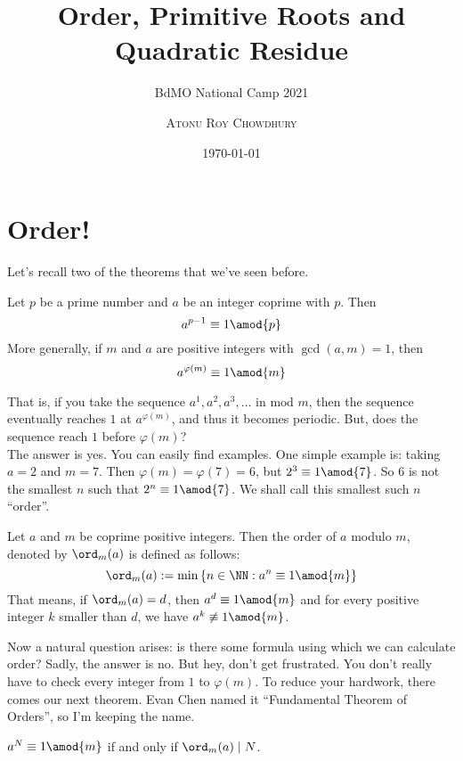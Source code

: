 \documentclass[11pt]{scrartcl}
\begin{document}
\title{Order, Primitive Roots and Quadratic Residue}
\subtitle{BdMO National Camp 2021}
\author{\scshape{Atonu Roy Chowdhury} \\
}
\date{\today}
\maketitle

\section{Order!}
Let's recall two of the theorems that we've seen before.
\begin{theorem}
Let \(p\) be a prime number and \(a\) be an integer coprime with \(p\). Then
\[a^{p-1}\equiv 1 \amod{p}\]
More generally, if \(m\) and \(a\) are positive integers with \(\gcd(a,m) =1\), then
\[a^{\varphi(m)} \equiv 1 \amod{m}\]
\end{theorem}
That is, if you take the sequence \(a^1, a^2, a^3, \ldots\) in \(\text{mod }m\), then the sequence eventually reaches \(1\) at \(a^{\varphi(m)}\), and thus it becomes periodic. But, does the sequence reach \(1\) before \(\varphi(m)\)?\\
The answer is yes. You can easily find examples. One simple example is: taking \(a=2\) and \(m=7\). Then \(\varphi(m)=\varphi(7)=6\), but \(2^3 \equiv 1 \amod{7}\). So \(6\) is not the smallest \(n\) such that \(2^n \equiv 1 \amod{7}\). We shall call this smallest such \(n\) ``order''. 
\begin{defn}
Let \(a\) and \(m\) be coprime positive integers. Then the order of \(a\) modulo \(m\), denoted by \(\ord_m(a)\) is defined as follows:
\[\ord_m(a) := \min \left\{n\in\NN : a^n \equiv 1 \amod{m}\right\}\]
That means, if \(\ord_m(a) = d\), then \(a^d \equiv 1 \amod{m}\) and for every positive integer \(k\) smaller than \(d\), we have \(a^k \not\equiv 1 \amod{m}\).
\end{defn}
Now a natural question arises: is there some formula using which we can calculate order? Sadly, the answer is no. But hey, don't get frustrated. You don't really have to check every integer from \(1\) to \(\varphi(m)\). To reduce your hardwork, there comes our next theorem. Evan Chen named it ``Fundamental Theorem of Orders'', so I'm keeping the name.
\begin{theorem}
\(a^N \equiv 1 \amod{m}\) if and only if \(\ord_m(a) \mid N\). 
\end{theorem}
\end{document}
